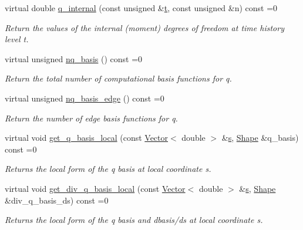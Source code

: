 \begin{DoxyCompactItemize}
virtual double \hyperlink{classoomph_1_1PoroelasticityEquations_a98223c55e8801bce16d77e4361b2aa64}{q\+\_\+internal} (const unsigned \&\hyperlink{cfortran_8h_af6f0bd3dc13317f895c91323c25c2b8f}{t}, const unsigned \&n) const =0
\begin{DoxyCompactList}\small\item\em Return the values of the internal (moment) degrees of freedom at time history level t. \end{DoxyCompactList}\item 
virtual unsigned \hyperlink{classoomph_1_1PoroelasticityEquations_aec90144cc61d817c97bee414e90921af}{nq\+\_\+basis} () const =0
\begin{DoxyCompactList}\small\item\em Return the total number of computational basis functions for q. \end{DoxyCompactList}\item 
virtual unsigned \hyperlink{classoomph_1_1PoroelasticityEquations_a81b78261be29e506dc70a59c2925c061}{nq\+\_\+basis\+\_\+edge} () const =0
\begin{DoxyCompactList}\small\item\em Return the number of edge basis functions for q. \end{DoxyCompactList}\item 
virtual void \hyperlink{classoomph_1_1PoroelasticityEquations_ab1784901ec76efaefc0a4b3f12cd9078}{get\+\_\+q\+\_\+basis\+\_\+local} (const \hyperlink{classoomph_1_1Vector}{Vector}$<$ double $>$ \&\hyperlink{cfortran_8h_ab7123126e4885ef647dd9c6e3807a21c}{s}, \hyperlink{classoomph_1_1Shape}{Shape} \&q\+\_\+basis) const =0
\begin{DoxyCompactList}\small\item\em Returns the local form of the q basis at local coordinate s. \end{DoxyCompactList}\item 
virtual void \hyperlink{classoomph_1_1PoroelasticityEquations_ae137222ce1c7904212ce34ad180123f8}{get\+\_\+div\+\_\+q\+\_\+basis\+\_\+local} (const \hyperlink{classoomph_1_1Vector}{Vector}$<$ double $>$ \&\hyperlink{cfortran_8h_ab7123126e4885ef647dd9c6e3807a21c}{s}, \hyperlink{classoomph_1_1Shape}{Shape} \&div\+\_\+q\+\_\+basis\+\_\+ds) const =0
\begin{DoxyCompactList}\small\item\em Returns the local form of the q basis and dbasis/ds at local coordinate s. \end{DoxyCompactList}\item 

\end{DoxyCompactItemize}
